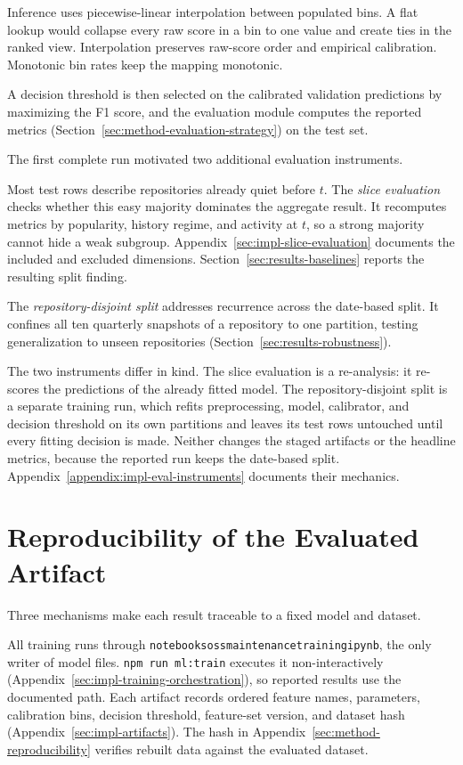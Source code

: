 Inference uses piecewise-linear interpolation between populated bins. A flat
lookup would collapse every raw score in a bin to one value and create ties in
the ranked view. Interpolation preserves raw-score order and empirical
calibration. Monotonic bin rates keep the mapping monotonic.

A decision threshold is then selected on the calibrated validation predictions by maximizing the F1 score, and the evaluation module computes the reported metrics (Section~\ref{sec:method-evaluation-strategy}) on the test set.

The first complete run motivated two additional evaluation instruments.

Most test rows describe repositories already quiet before \(t\). The
\emph{slice evaluation} checks whether this easy majority dominates the
aggregate result. It recomputes metrics by popularity, history regime, and
activity at \(t\), so a strong majority cannot hide a weak subgroup.
Appendix~\ref{sec:impl-slice-evaluation} documents the included and excluded
dimensions. Section~\ref{sec:results-baselines} reports the resulting split
finding.

The \emph{repository-disjoint split} addresses recurrence across the date-based
split. It confines all ten quarterly snapshots of a repository to one partition,
testing generalization to unseen repositories
(Section~\ref{sec:results-robustness}).

The two instruments differ in kind. The slice evaluation is a re-analysis: it
re-scores the predictions of the already fitted model. The repository-disjoint
split is a separate training run, which refits preprocessing, model, calibrator,
and decision threshold on its own partitions and leaves its test rows untouched
until every fitting decision is made. Neither changes the staged artifacts or the
headline metrics, because the reported run keeps the date-based split.
Appendix~\ref{appendix:impl-eval-instruments}
documents their mechanics.

\section{Reproducibility of the Evaluated Artifact}
\label{sec:impl-deployment}

Three mechanisms make each result traceable to a fixed model and dataset.

All training runs through
\texttt{notebooks\sslash oss\sdash maintenance\sdash training\sdot ipynb}, the
only writer of model files. \texttt{npm run ml:train} executes it
non-interactively (Appendix~\ref{sec:impl-training-orchestration}), so reported
results use the documented path. Each artifact records ordered feature names,
parameters, calibration bins, decision threshold, feature-set version, and
dataset hash (Appendix~\ref{sec:impl-artifacts}). The hash in
Appendix~\ref{sec:method-reproducibility} verifies rebuilt data against the
evaluated dataset.

